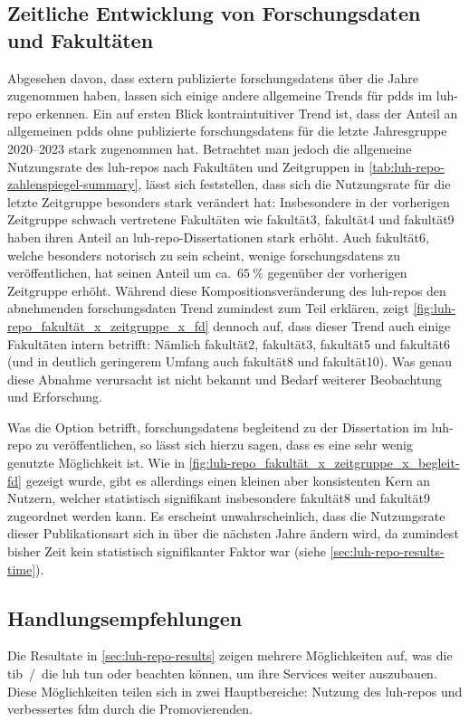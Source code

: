 \subsection{Zeitliche Entwicklung von Forschungsdaten und Fakultäten}
Abgesehen davon, dass extern publizierte \glspl{forschungsdaten} über die Jahre zugenommen haben, lassen sich einige andere allgemeine Trends für \glspl{pdd} im \gls{luh-repo} erkennen.
Ein auf ersten Blick kontraintuitiver Trend ist, dass der Anteil an allgemeinen \glspl{pdd} ohne publizierte \glspl{forschungsdaten} für die letzte Jahresgruppe 2020--2023 stark zugenommen hat.
Betrachtet man jedoch die allgemeine Nutzungsrate des \gls{luh-repo}s nach Fakultäten und Zeitgruppen in \cref{tab:luh-repo-zahlenspiegel-summary}, lässt sich feststellen, dass sich die Nutzungsrate für die letzte Zeitgruppe besonders stark verändert hat:
Insbesondere in der vorherigen Zeitgruppe schwach vertretene Fakultäten wie \gls{fakultät3}, \gls{fakultät4} und \gls{fakultät9} haben ihren Anteil an \gls{luh-repo}-Dissertationen stark erhöht.
Auch \gls{fakultät6}, welche besonders notorisch zu sein scheint, wenige \glspl{forschungsdaten} zu veröffentlichen, hat seinen Anteil um ca.~$\SI{65}{\percent}$ gegenüber der vorherigen Zeitgruppe erhöht.
Während diese Kompositionsveränderung des \gls{luh-repo}s den abnehmenden \gls{forschungsdaten} Trend zumindest zum Teil erklären, zeigt \cref{fig:luh-repo_fakultät_x_zeitgruppe_x_fd} dennoch auf, dass dieser Trend auch einige Fakultäten intern betrifft:
Nämlich \gls{fakultät2}, \gls{fakultät3}, \gls{fakultät5} und \gls{fakultät6} (und in deutlich geringerem Umfang auch \gls{fakultät8} und \gls{fakultät10}).
Was genau diese Abnahme verursacht ist nicht bekannt und Bedarf weiterer Beobachtung und Erforschung.

Was die Option betrifft, \glspl{forschungsdaten} begleitend zu der Dissertation im \gls{luh-repo} zu veröffentlichen, so lässt sich hierzu sagen, dass es eine sehr wenig genutzte Möglichkeit ist.
Wie in \cref{fig:luh-repo_fakultät_x_zeitgruppe_x_begleit-fd} gezeigt wurde, gibt es allerdings einen kleinen aber konsistenten Kern an Nutzern, welcher statistisch signifikant insbesondere \gls{fakultät8} und \gls{fakultät9} zugeordnet werden kann.
Es erscheint unwahrscheinlich, dass die Nutzungsrate dieser Publikationsart sich in über die nächsten Jahre ändern wird, da zumindest bisher Zeit kein statistisch signifikanter Faktor war (siehe \cref{sec:luh-repo-results-time}).

\subsection{Handlungsempfehlungen}
Die Resultate in \cref{sec:luh-repo-results} zeigen mehrere Möglichkeiten auf, was die \gls{tib}~/~die \gls{luh} tun oder beachten können, um ihre Services weiter auszubauen.
Diese Möglichkeiten teilen sich in zwei Hauptbereiche: Nutzung des \gls{luh-repo}s und verbessertes \gls{fdm} durch die Promovierenden.

